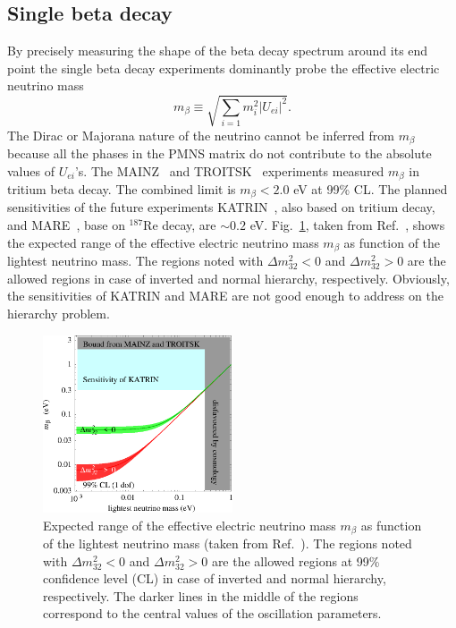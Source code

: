 \subsection{Single beta decay}
\label{sec:sbd}
By precisely measuring the shape of the beta decay spectrum around its end point the single beta decay experiments dominantly probe the effective electric neutrino mass
\begin{equation}
  \label{eq:m1b}
  m_{\beta} \equiv \sqrt{\sum_{i=1}m_{i}^{2}|U_{ei}|^{2}}.
\end{equation}
The Dirac or Majorana nature of the neutrino cannot be inferred from $m_{\beta}$ because all the phases in the PMNS matrix do not contribute to the absolute values of $U_{ei}$'s. The MAINZ~\cite{Mai99} and TROITSK~\cite{Tro99} experiments measured $m_{\beta}$ in tritium beta decay. The combined limit is $m_{\beta} < 2.0$ eV at 99\% CL. The planned sensitivities of the future experiments KATRIN~\cite{Kat01}, also based on tritium decay, and MARE~\cite{Mar05}, base on $^{187}$Re decay, are $\sim 0.2$ eV. Fig.~\ref{fig:m1bVSlightest}, taken from Ref.~\cite{Str05}, shows the expected range of the effective electric neutrino mass $m_{\beta}$ as function of the lightest neutrino mass. The regions noted with $\Delta m^{2}_{32}<0$ and $\Delta m^{2}_{32}>0$ are the allowed regions in case of inverted and normal hierarchy, respectively. Obviously, the sensitivities of KATRIN and MARE are not good enough to address on the hierarchy problem.
\begin{figure}[tbhp]
  \centering
  \includegraphics[width=0.5\textwidth]{m1bVSlightest.eps}  
  \caption{Expected range of the effective electric neutrino mass     $m_{\beta}$ as function of the lightest neutrino mass (taken from     Ref.~\cite{Str05}). The regions noted with $\Delta m^{2}_{32}<0$     and $\Delta m^{2}_{32}>0$ are the allowed regions at 99\%     confidence level (CL) in case of inverted and normal hierarchy,     respectively. The darker lines in the middle of the regions     correspond to the central values of the oscillation parameters.}
  \label{fig:m1bVSlightest}
\end{figure}

